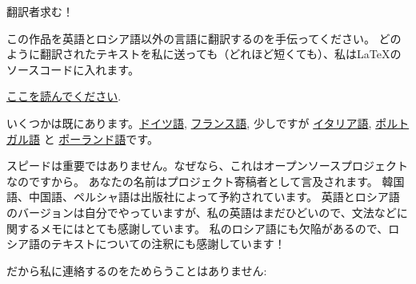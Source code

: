 \vspace*{\fill}

\Huge 翻訳者求む！

\normalsize

\bigskip
\bigskip
\bigskip

この作品を英語とロシア語以外の言語に翻訳するのを手伝ってください。
どのように翻訳されたテキストを私に送っても（どれほど短くても）、私はLaTeXのソースコードに入れます。

\href{https://github.com/DennisYurichev/RE-for-beginners/blob/master/Translation.md}{ここを読んでください}.

いくつかは既にあります。\href{https://beginners.re/RE4B-DE.pdf}{ドイツ語},
\href{https://beginners.re/RE4B-FR.pdf}{フランス語}, 少しですが
\href{https://yurichev.com/tmp/RE4B-IT-partial.pdf}{イタリア語},
\href{https://yurichev.com/tmp/RE4B-PTBR-lite2.pdf}{ポルトガル語} と
\href{https://yurichev.com/tmp/RE4B-PL.pdf}{ポーランド語}です。

スピードは重要ではありません。なぜなら、これはオープンソースプロジェクトなのですから。
あなたの名前はプロジェクト寄稿者として言及されます。
韓国語、中国語、ペルシャ語は出版社によって予約されています。
英語とロシア語のバージョンは自分でやっていますが、私の英語はまだひどいので、文法などに関するメモにはとても感謝しています。
私のロシア語にも欠陥があるので、ロシア語のテキストについての注釈にも感謝しています！

だから私に連絡するのをためらうことはありません: \GTT{\EMAIL}

\vspace*{\fill}
\vfill
